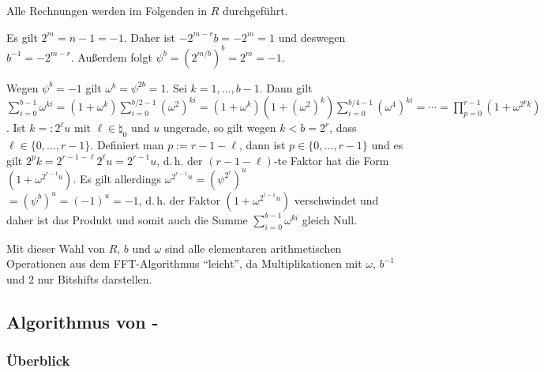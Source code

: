 \begin{Beweis}
    Alle Rechnungen werden im Folgenden in $R$ durchgeführt.

    Es gilt $2^m = n - 1 = -1$.
    Daher ist $-2^{m-r} b = -2^m = 1$ und deswegen $b^{-1} = -2^{m-r}$.
    Außerdem folgt $\psi^b = (2^{m/b})^b = 2^m = -1$.

    Wegen $\psi^b = -1$ gilt $\omega^b = \psi^{2b} = 1$.
    Sei $k = 1, \dotsc, b - 1$.
    Dann gilt\\
    $\sum_{i=0}^{b-1} \omega^{ki} = (1 + \omega^k) \sum_{i=0}^{b/2-1} (\omega^2)^{ki}
    = (1 + \omega^k) (1 + (\omega^2)^k) \sum_{i=0}^{b/4-1} (\omega^4)^{ki}
    = \dotsb
    = \prod_{p=0}^{r-1} (1 + \omega^{2^p k})$.
    Ist $k =: 2^\ell u$ mit $\ell \in \natural_0$ und $u$ ungerade,
    so gilt wegen $k < b = 2^r$, dass $\ell \in \{0, \dotsc, r - 1\}$.
    Definiert man $p := r - 1 - \ell$, dann ist $p \in \{0, \dotsc, r - 1\}$ und
    es gilt $2^p k = 2^{r-1-\ell} 2^\ell u = 2^{r-1} u$,
    d.\,h. der $(r-1-\ell)$-te Faktor hat die Form $(1 + \omega^{2^{r-1} u})$.
    Es gilt allerdings $\omega^{2^{r-1} u} = (\psi^{2^r})^u$\\
    $= (\psi^b)^u = (-1)^u = -1$,
    d.\,h. der Faktor $(1 + \omega^{2^{r-1} u})$ verschwindet und
    daher ist das Produkt und somit auch die Summe
    $\sum_{i=0}^{b-1} \omega^{ki}$ gleich Null.
\end{Beweis}

Mit dieser Wahl von $R$, $b$ und $\omega$ sind alle elementaren arithmetischen Operationen
aus dem FFT-Algorithmus "`leicht"', da Multiplikationen mit $\omega$, $b^{-1}$ und $2$ nur
Bitshifts darstellen.

\pagebreak

\subsection{%
    Algorithmus von -%
}

\subsubsection{%
    Überblick%
}

